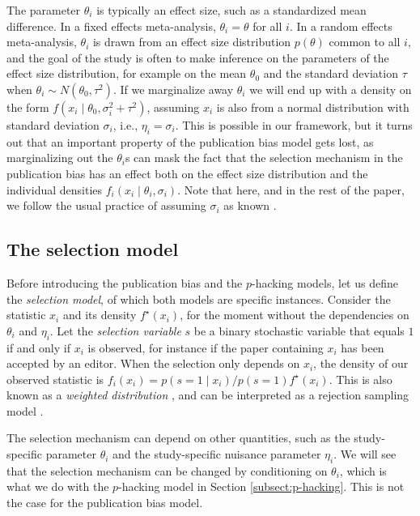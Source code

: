 \documentclass[useAMS,usenatbib,referee]{biom}
\begin{document}
The parameter $\theta_{i}$ is typically an effect size, such as a standardized mean difference. In a fixed effects meta-analysis, $\theta_{i}=\theta$ for all $i$. In a random effects meta-analysis, $\theta_{i}$ is drawn from an effect size distribution $p(\theta)$ common to all $i$, and the goal of the study is often to make inference on the parameters of the effect size distribution, for example on the mean $\theta_{0}$ and the standard deviation $\tau$ when $\theta_i \sim N(\theta_{0},\tau^2)$. If we marginalize away $\theta_{i}$ we will end up with a density on the form $f(x_{i}\mid \theta_{0},\sigma_{i}^{2}+\tau^{2})$, assuming $x_{i}$ is also from a normal distribution with standard deviation $\sigma_{i}$, i.e., $\eta_i = \sigma_i$. This is possible in our framework, but it turns out that an important property of the publication bias model gets lost, as marginalizing out the $\theta_{i}$s can mask the fact that the selection mechanism in the publication bias has an effect both on the effect size distribution and the individual densities $f_{i}(x_{i}\mid\theta_i, \sigma_i)$. Note that here, and in the rest of the paper, we follow the usual practice of assuming $\sigma_i$ as known \citep{vanHouwelingen2002}.

\subsection{The selection model}\label{subsec:selectionModel}
Before introducing the publication bias and the $p$-hacking models, let us define the \emph{selection model}, of which both models are specific instances. Consider the statistic $x_i$ and its density $f^{\star}(x_{i})$, for the moment without the dependencies on $\theta_{i}$ and $\eta_{i}$. Let the \emph{selection variable} $s$ be a binary stochastic variable that equals $1$ if and only if $x_i$ is observed, for instance if the paper containing $x_i$ has been accepted by an editor. When the selection only depends on $x_i$, the density of our observed statistic is $f_{i}(x_{i}) = p(s=1\mid x_i)/p(s=1)f^{\star}(x_{i})$. This is also known as a \emph{weighted distribution} \citep[][eq. 3.1]{rao1985weighted}, and can be interpreted as a rejection sampling model \citep{von1951various}.

The selection mechanism can depend on other quantities, such as the study-specific parameter $\theta_i$ and the study-specific nuisance parameter $\eta_{i}$. We will see that the selection mechanism can be changed by conditioning on $\theta_i$, which is what we do with the $p$-hacking model in Section \ref{subsect:p-hacking}. This is not the case for the publication bias model.
\end{document}
